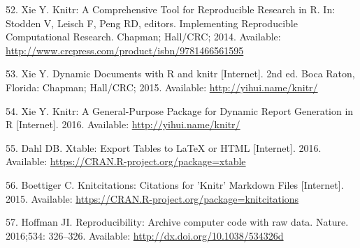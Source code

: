 \documentclass[]{article}
\begin{document}
\hypertarget{ref-stodden_knitr:_2014}{}
52. Xie Y. Knitr: A Comprehensive Tool for Reproducible Research in R.
In: Stodden V, Leisch F, Peng RD, editors. Implementing Reproducible
Computational Research. Chapman; Hall/CRC; 2014. Available:
\url{http://www.crcpress.com/product/isbn/9781466561595}

\hypertarget{ref-xie_dynamic_2015}{}
53. Xie Y. Dynamic Documents with R and knitr {[}Internet{]}. 2nd ed.
Boca Raton, Florida: Chapman; Hall/CRC; 2015. Available:
\url{http://yihui.name/knitr/}

\hypertarget{ref-xie_knitr:_2016}{}
54. Xie Y. Knitr: A General-Purpose Package for Dynamic Report
Generation in R {[}Internet{]}. 2016. Available:
\url{http://yihui.name/knitr/}

\hypertarget{ref-dahl_xtable:_2016}{}
55. Dahl DB. Xtable: Export Tables to LaTeX or HTML {[}Internet{]}.
2016. Available: \url{https://CRAN.R-project.org/package=xtable}

\hypertarget{ref-boettiger_knitcitations:_2015}{}
56. Boettiger C. Knitcitations: Citations for 'Knitr' Markdown Files
{[}Internet{]}. 2015. Available:
\url{https://CRAN.R-project.org/package=knitcitations}

\hypertarget{ref-hoffman_reproducibility:_2016}{}
57. Hoffman JI. Reproducibility: Archive computer code with raw data.
Nature. 2016;534: 326--326. Available:
\url{http://dx.doi.org/10.1038/534326d}
\end{document}
